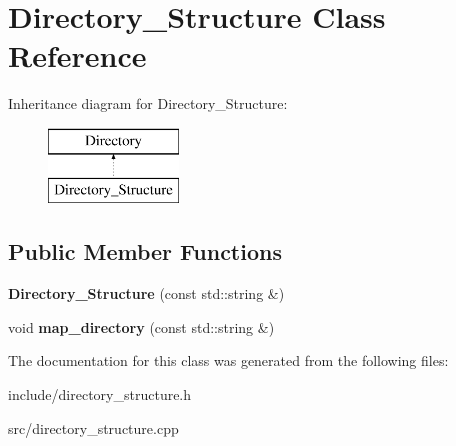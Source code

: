 \hypertarget{class_directory___structure}{}\section{Directory\+\_\+\+Structure Class Reference}
\label{class_directory___structure}
Inheritance diagram for Directory\+\_\+\+Structure\+:\begin{figure}[H]
\begin{center}
\leavevmode
\includegraphics[height=2.000000cm]{class_directory___structure}
\end{center}
\end{figure}
\subsection*{Public Member Functions}
\begin{DoxyCompactItemize}
\item 
\mbox{\label{class_directory___structure_ab8fc3a4c43a8368440260becd511f660}} 
{\bfseries Directory\+\_\+\+Structure} (const std\+::string \&)
\item 
\mbox{\label{class_directory___structure_a9ebc08c7aea0df68cc3d7fdbecd3d32e}} 
void {\bfseries map\+\_\+directory} (const std\+::string \&)
\end{DoxyCompactItemize}


The documentation for this class was generated from the following files\+:\begin{DoxyCompactItemize}
\item 
include/directory\+\_\+structure.\+h\item 
src/directory\+\_\+structure.\+cpp\end{DoxyCompactItemize}

